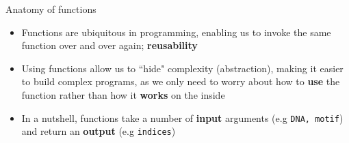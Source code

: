\documentclass[xcolor=table]{beamer}
\begin{document}
\begin{frame}{Anatomy of functions}

\begin{itemize}\addtolength{\itemsep}{0.5\baselineskip}
	\item<1-> Functions are ubiquitous in programming, enabling us to invoke the same
	function over and over again; \textbf{reusability}

	\item<2-> Using functions allow us to ``hide" complexity (abstraction), 
	making it easier to build complex programs, as we only need to 
	worry about how to \textbf{use} the function rather than how it \textbf{works}
	on the inside

	\item<3-> In a nutshell, functions take a number of \textbf{input} arguments
	(e.g \texttt{DNA, motif}) and return an \textbf{output} (e.g \texttt{indices})
\end{itemize}
\vfill
\begin{center}
\end{center}

\end{frame}
\end{document}
